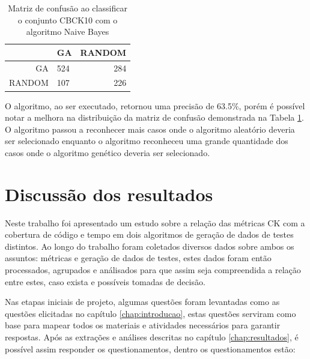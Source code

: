 \documentclass[
	12pt,				%
	oneside,			%
	a4paper,			%
	english,			%
	brazil				%
	]{abntex2ppgsi}
\begin{document}
\begin{table}[h]
\centering
\caption{Matriz de confusão ao classificar o conjunto CBCK10 com o algoritmo Naive Bayes}
\vspace{0.5cm}
\begin{tabular}{r|lr}

										
 & GA & RANDOM \\ %
\hline                               %
GA		& 524		& 284 \\
RANDOM		& 107		& 226
\end{tabular}
\label{table:confusao-hibrido-plus}
\end{table}

O algoritmo, ao ser executado, retornou uma precisão de 63.5\%, porém é possível notar a melhora na distribuição da matriz de confusão demonstrada na Tabela \ref{table:confusao-hibrido-plus}. O algoritmo passou a reconhecer mais casos onde o algoritmo aleatório deveria ser selecionado enquanto o algoritmo reconheceu uma grande quantidade dos casos onde o algoritmo genético deveria ser selecionado.




\section{Discussão dos resultados}
Neste trabalho foi apresentado um estudo sobre a relação das métricas CK com a cobertura de código e tempo em dois algoritmos de geração de dados de testes distintos.
Ao longo do trabalho foram coletados diversos dados sobre ambos os assuntos: métricas e geração de dados de testes, estes dados foram então processados, agrupados e análisados para que assim seja compreendida a relação entre estes, caso exista e possíveis tomadas de decisão.

Nas etapas iniciais de projeto, algumas questões foram levantadas como as questões elicitadas no capítulo \ref{chap:introducao}, estas questões serviram como base para mapear todos os materiais e atividades necessários para garantir respostas. Após as  extrações e análises  descritas no capítulo \ref{chap:resultados}, é possível assim responder os questionamentos, dentro os questionamentos estão:\\

\\
\end{document}
